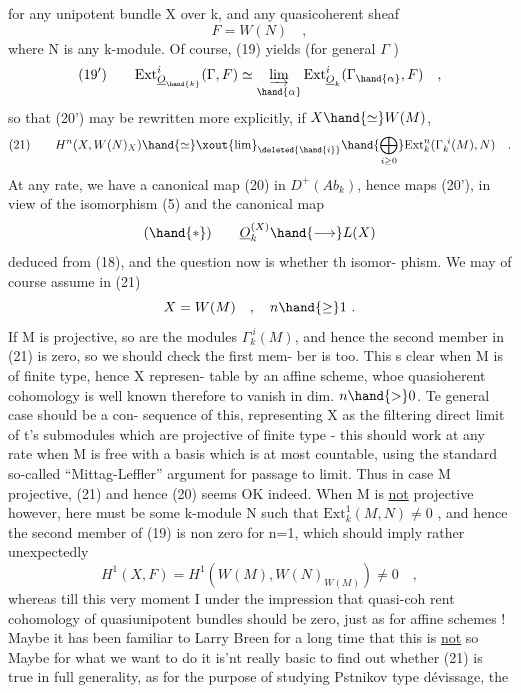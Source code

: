 
for any unipotent bundle X over k,  and any quasicoherent sheaf
\[ F = W(N) \quad , \]
where N is any k-module.  Of course, (19)  yields (for general $\Gamma$ )
\[ (19') \qquad \mathrm{Ext}^{i}_{\underline{O}_{\hand{k}}}( \Gamma , F) \simeq \varinjlim_{\hand{\alpha}} \mathrm{Ext}^{i}_{\underline{O}_k}( \Gamma_{\hand{\alpha}} , F) \quad , \]
so that (20')  may be rewritten more explicitly,  if  $X \hand{\simeq} W(M)$, 
\[ (21) \qquad H^{n}(X,W(N)_X) \hand{\simeq} \xout{\mathrm{lim}}_{\deleted{\hand{i}}} \hand{\bigoplus_{i\geq 0}} \mathrm{Ext}^{n}_{k}(\Gamma_k^{\ i}(M),N) \quad . \]
At any rate,  we have a canonical map (20) in $D^{+}(Ab_k)$,  hence maps
(20'),  in view of the isomorphism (5)  and the canonical map
\[ (\hand{*}) \qquad \underline{O}_k^{(X)} \hand{\longrightarrow} L(X) \]
deduced from (18),  and the question now is whether th  isomor-%
phism.  We may of course assume  in (21)
\[ X = W(M) \quad , \quad n \hand{\geq} 1 \ . \]
If M is projective,  so are the modules $\Gamma_k^{\ i}(M)$,  and hence 
the second  member in (21) is zero,  so we should check the first mem-%
ber is too.  This s clear when M is of finite type,  hence X represen-%
table by an affine scheme,  whoe quasioherent cohomology is well known
therefore to vanish in dim. $n \hand{>} 0$.  Te  general case should be a con-%
sequence of this,  representing X as the filtering direct limit of
t's submodules which are projective of finite type  -  this should work
at any rate when M is free with a basis which is at most countable,
using the standard so-called ``Mittag-Leffler'' argument for passage to
limit.   Thus in case M projective,  (21)  and hence (20) seems OK
indeed.  When M is \uline{not} projective however,  here must be some k-module
N such that  $\mathrm{Ext}^{1}_{k}(M,N) \neq 0$ ,  and hence the second member of (19) is
non zero for n=1,  which should imply rather unexpectedly
\[ H^{1}(X,F) = H^{1}(W(M), W(N)_{W(M)}) \neq 0 \quad , \]
whereas till this very moment I   under the impression that quasi-coh
rent cohomology of quasiunipotent bundles should be zero,  just as
for affine schemes !  Maybe it has been familiar to Larry Breen for a
long time that this is \uline{not} so  Maybe  for what we want to do it is'nt
really basic to find out whether (21) is true in full generality,  as
for the purpose of studying Pstnikov type dévissage,  the 


